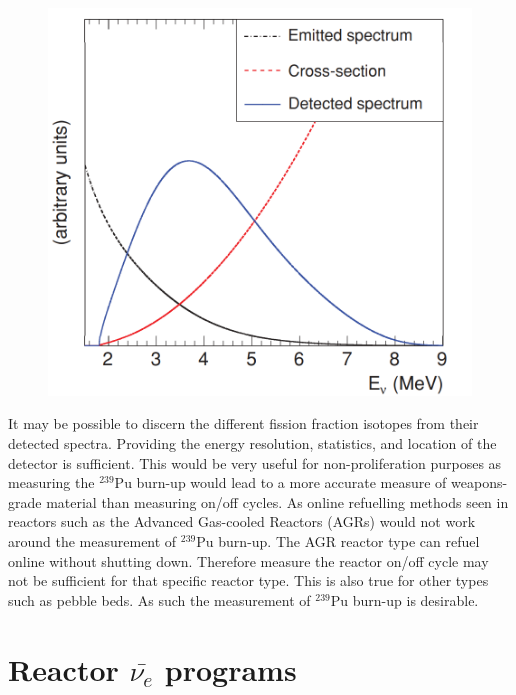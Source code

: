 \begin{figure}[!h]
 \centering
 \includegraphics[width=0.4\linewidth]{Chapter1/Figs/Raster/mullerEtAlDetectedSpectrum.png} %
 \label{mullerEtAlDetectedSpectrum}
\end{figure}

It may be possible to discern the different fission fraction isotopes from their detected spectra. Providing the energy resolution, statistics, and location of the detector is sufficient. This would be very useful for non-proliferation purposes as measuring the $^{239}$Pu burn-up would lead to a more accurate measure of weapons-grade material than measuring on/off cycles. As online refuelling methods seen in reactors such as the Advanced Gas-cooled Reactors (AGRs) would not work around the measurement of $^{239}$Pu burn-up. The AGR reactor type can refuel online without shutting down. Therefore measure the reactor on/off cycle may not be sufficient for that specific reactor type. This is also true for other types such as pebble beds. As such the measurement of $^{239}$Pu burn-up is desirable. 

\section{Reactor $\bar{\nu_e}$ programs}\label{sec:exisitingReactorMonitoringPrograms}

